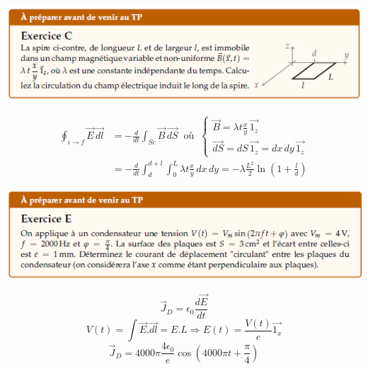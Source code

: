 \documentclass	[11pt, a4paper, openany]{book}
\begin{document}
 \newpage
\begin{center}
\includegraphics[scale=1]{prepa/exoC.png}\\
\end{center}
\begin{align*}\oint_{i\rightarrow f}\vec{E}\,\vec{dl} & =-\frac{d}{dt}\int_{Sc}\vec B\,\vec{dS}\ \text{ où }\ \left\{\begin{array}{l}
\vec B=\lambda t\frac{x}{y}\,\vec{1_z}\\
\vec{dS}=dS\,\vec{1_z}=dx\,dy\,\vec{1_z}\end{array}\right.\\
 & =-\frac{d}{dt}\int_d^{d+l}\int_0^L\lambda t\frac{x}{y}\,dx\,dy=-\lambda\frac{L^2}{2}\ln\left(1+\frac{l}{d}\right)\end{align*}


\begin{center}
\includegraphics[scale=1]{prepa/exoE.png}\\
\end{center}
$$\vec{J}_D = \epsilon_0 \frac{d\vec{E}}{dt}$$
$$V(t) = \int \vec{E}.\vec{dl} = E.L \Rightarrow E(t) = \frac{V(t)}{e}\vec{1_x}$$
$$\vec{J}_D = 4000\pi \frac{4 \epsilon_0}{e} \cos\left(4000\pi t + \frac{\pi}{4}\right)$$
\end{document}
